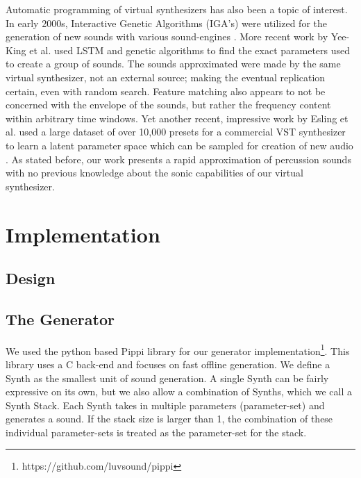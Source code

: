 \documentclass{nime-alternate} %
\begin{document}
Automatic programming of virtual synthesizers has also been a topic of interest. In early 2000s, Interactive Genetic Algorithms (IGA's) were utilized for the generation of new sounds with various sound-engines \cite{johnson1999exploring,dahlstedt2001creating}. More recent work by Yee-King et al. \cite{yee2018automatic} used LSTM and genetic algorithms to find the exact parameters used to create a group of sounds. The sounds approximated were made by the same virtual synthesizer, not an external source; making the eventual replication certain, even with random search. Feature matching also appears to not be concerned with the envelope of the sounds, but rather the frequency content within arbitrary time windows. Yet another recent, impressive work by Esling et al. used a large dataset of over 10,000 presets for a commercial VST synthesizer to learn a latent parameter space which can be sampled for creation of new audio \cite{esling2019universal}. As stated before, our work presents a rapid approximation of percussion sounds with no previous knowledge about the sonic capabilities of our virtual synthesizer.
\section{Implementation}
\label{impl}
\subsection{Design}
 

\subsection{The Generator}
We used the python based Pippi library for our generator implementation\footnote{https://github.com/luvsound/pippi}. This library uses a C back-end and focuses on fast offline generation. We define a Synth as the smallest unit of sound generation. A single Synth can be fairly expressive on its own, but we also allow a combination of Synths, which we call a Synth Stack. Each Synth takes in multiple parameters (parameter-set) and generates a sound. If the stack size is larger than 1, the combination of these individual parameter-sets is treated as the parameter-set for the stack. 
\end{document}
